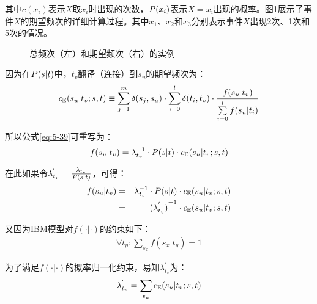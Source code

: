 \noindent 其中$c(x_i)$表示$X$取$x_i$时出现的次数，${P}(x_i)$表示$X=x_i$出现的概率。图\ref{fig:5-26}展示了事件$X$的期望频次的详细计算过程。其中$x_1$、$x_2$和$x_3$分别表示事件$X$出现2次、1次和5次的情况。

\begin{figure}[htp]
    \centering
\subfigure{}
\subfigure{}
   \caption{总频次（左）和期望频次（右）的实例}
   \label{fig:5-26}
\end{figure}

\parinterval 因为在${P}({s}|{t})$中，$t_v$翻译（连接）到$s_u$的期望频次为：
\begin{eqnarray}
c_{\mathbb{E}}(s_u|t_v;{s},{t}) \equiv \sum\limits_{j=1}^{m} \delta(s_j,s_u) \cdot \sum\limits_{i=0}^{l} \delta(t_i,t_v) \cdot \frac {f(s_u|t_v)}{\sum\limits_{i=0}^{l}f(s_u|t_i)}
\label{eq:5-40}
\end{eqnarray}

\parinterval 所以公式\ref {eq:5-39}可重写为：
\begin{eqnarray}
f(s_u|t_v)=\lambda_{t_v}^{-1} \cdot {P}({s}| {t}) \cdot c_{\mathbb{E}}(s_u|t_v;{s},{t})
\label{eq:5-41}
\end{eqnarray}

\parinterval 在此如果令$\lambda_{t_v}^{'}=\frac{\lambda_{t_v}}{{P}({s}| {t})}$，可得：
\begin{eqnarray}
f(s_u|t_v) &= &\lambda_{t_v}^{-1} \cdot {P}({s}| {t}) \cdot c_{\mathbb{E}}(s_u|t_v;{s},{t}) \nonumber \\
 &=&{(\lambda_{t_v}^{'})}^{-1} \cdot c_{\mathbb{E}}(s_u|t_v;{s},{t})
\label{eq:5-42}
\end{eqnarray}

\parinterval 又因为IBM模型对$f(\cdot|\cdot)$的约束如下：
\begin{eqnarray}
\forall t_y : \sum\limits_{s_x} f(s_x|t_y) =1
\label{eq:5-43}
\end{eqnarray}

\parinterval 为了满足$f(\cdot|\cdot)$的概率归一化约束，易知$\lambda_{t_v}^{'}$为：
\begin{eqnarray}
\lambda_{t_v}^{'}=\sum\limits_{s_u} c_{\mathbb{E}}(s_u|t_v;{s},{t})
\label{eq:5-44}
\end{eqnarray}

